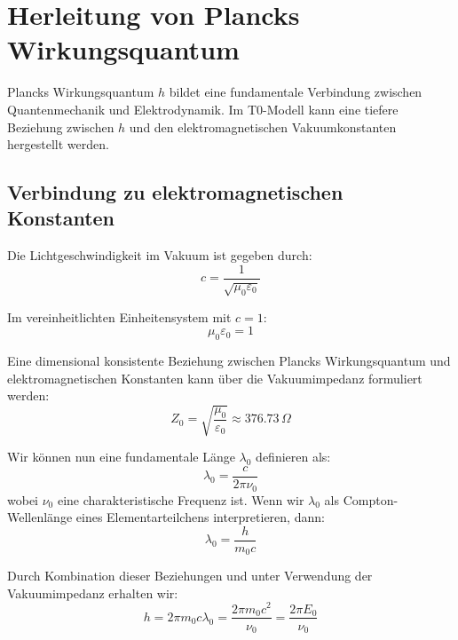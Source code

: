 \documentclass[12pt,a4paper]{article}
\begin{document}
	\section{Herleitung von Plancks Wirkungsquantum}
	\label{sec:planck_quantum}
	
	Plancks Wirkungsquantum \(h\) bildet eine fundamentale Verbindung zwischen Quantenmechanik und Elektrodynamik. Im T0-Modell kann eine tiefere Beziehung zwischen \(h\) und den elektromagnetischen Vakuumkonstanten hergestellt werden.
	
	\subsection{Verbindung zu elektromagnetischen Konstanten}
	\label{subsec:electromagnetic_constants}
	
	Die Lichtgeschwindigkeit im Vakuum ist gegeben durch:
	\begin{equation}
		\label{eq:speed_of_light}
		c = \frac{1}{\sqrt{\mu_0 \varepsilon_0}}
	\end{equation}
	
	Im vereinheitlichten Einheitensystem mit \(c = 1\):
	\begin{equation}
		\label{eq:mu_epsilon}
		\mu_0 \varepsilon_0 = 1
	\end{equation}
	
	Eine dimensional konsistente Beziehung zwischen Plancks Wirkungsquantum und elektromagnetischen Konstanten kann über die Vakuumimpedanz formuliert werden:
	\begin{equation}
		\label{eq:vacuum_impedance}
		Z_0 = \sqrt{\frac{\mu_0}{\varepsilon_0}} \approx 376.73 \, \Omega
	\end{equation}
	
	Wir können nun eine fundamentale Länge \(\lambda_0\) definieren als:
	\begin{equation}
		\lambda_0 = \frac{c}{2\pi \nu_0}
	\end{equation}
	wobei \(\nu_0\) eine charakteristische Frequenz ist. Wenn wir \(\lambda_0\) als Compton-Wellenlänge eines Elementarteilchens interpretieren, dann:
	\begin{equation}
		\lambda_0 = \frac{h}{m_0 c}
	\end{equation}
	
	Durch Kombination dieser Beziehungen und unter Verwendung der Vakuumimpedanz erhalten wir:
	\begin{equation}
		h = 2\pi m_0 c \lambda_0 = \frac{2\pi m_0 c^2}{\nu_0} = \frac{2\pi E_0}{\nu_0}
	\end{equation}
	
\end{document}
